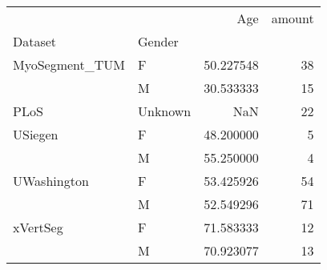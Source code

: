 \begin{tabular}{llrr}
\toprule
         &   &        Age &  amount \\
Dataset & Gender &            &         \\
\midrule
MyoSegment\_TUM & F &  50.227548 &      38 \\
         & M &  30.533333 &      15 \\
PLoS & Unknown &        NaN &      22 \\
USiegen & F &  48.200000 &       5 \\
         & M &  55.250000 &       4 \\
UWashington & F &  53.425926 &      54 \\
         & M &  52.549296 &      71 \\
xVertSeg & F &  71.583333 &      12 \\
         & M &  70.923077 &      13 \\
\bottomrule
\end{tabular}
